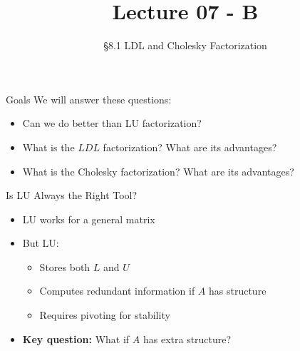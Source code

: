 \documentclass[10pt]{beamer}
\title[Math/CS 375]{Lecture 07 - B}
\subtitle{\S 8.1 LDL and Cholesky Factorization}
\begin{document}
\begin{frame}
  \titlepage
\end{frame}
\begin{frame}{Goals}
We will answer these questions:\\[3mm]
\begin{itemize}
    \item Can we do better than LU factorization?
    \item What is the $LDL$ factorization? What are its advantages?
    \item What is the Cholesky factorization? What are its advantages? 
\end{itemize}
\end{frame}

\begin{frame}{Is LU Always the Right Tool?}
\begin{itemize}
    \item LU works for a general matrix 
    \item But LU:
    \begin{itemize}
        \item Stores both $L$ and $U$
        \item Computes redundant information if $A$ has structure
        \item Requires pivoting for stability
    \end{itemize}
    \vspace{2mm}

    \item \textbf{Key question:} What if $A$ has extra structure?
    
\end{itemize}


\end{frame}
\end{document}
